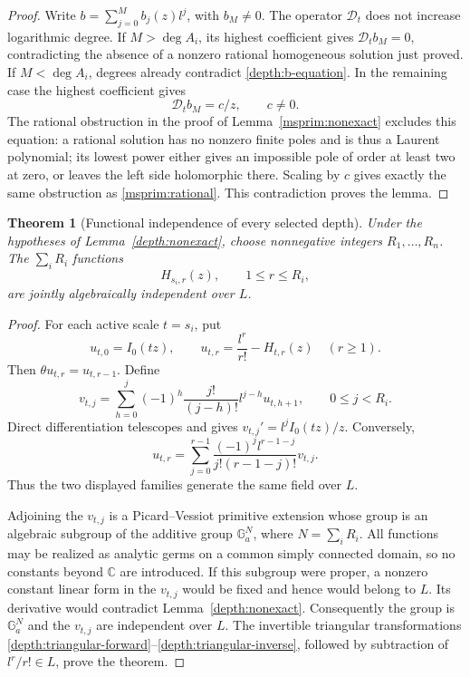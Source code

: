\documentclass[11pt]{article}
\newtheorem{theorem}{Theorem}[section]
\theoremstyle{definition}
\theoremstyle{remark}
\begin{document}
\begin{proof}
Write $b=\sum_{j=0}^M b_j(z)l^j$, with $b_M\ne0$.
The operator $\mathcal D_t$ does not increase logarithmic degree.
If $M>\deg A_i$, its highest coefficient gives
$\mathcal D_t b_M=0$, contradicting the absence of a nonzero
rational homogeneous solution just proved.  If $M<\deg A_i$,
degrees already contradict \eqref{depth:b-equation}.  In the remaining
case the highest coefficient gives
\[
                  \mathcal D_t b_M=c/z,\qquad c\ne0.
\]
The rational obstruction in the proof of
Lemma~\ref{msprim:nonexact} excludes this equation: a rational
solution has no nonzero finite poles and is thus a Laurent
polynomial; its lowest power either gives an impossible pole of
order at least two at zero, or leaves the left side holomorphic
there.  Scaling by $c$ gives exactly the same obstruction as
\eqref{msprim:rational}.  This contradiction proves the lemma.
\end{proof}

\begin{theorem}[Functional independence of every selected depth]
\label{depth:functional}
Under the hypotheses of Lemma~\ref{depth:nonexact}, choose
nonnegative integers $R_1,\ldots,R_n$.  The
$\sum_iR_i$ functions
\[
               H_{s_i,r}(z),\qquad 1\le r\le R_i,
\]
are jointly algebraically independent over $L$.
\end{theorem}

\begin{proof}
For each active scale $t=s_i$, put
\[
 u_{t,0}=I_0(tz),\qquad
 u_{t,r}=\frac{l^r}{r!}-H_{t,r}(z)\quad(r\ge1).
\]
Then $\theta u_{t,r}=u_{t,r-1}$.  Define
\begin{equation}\label{depth:triangular-forward}
 v_{t,j}=\sum_{h=0}^j
       (-1)^h\frac{j!}{(j-h)!}l^{j-h}u_{t,h+1},
       \qquad 0\le j<R_i.
\end{equation}
Direct differentiation telescopes and gives
$v_{t,j}'=l^j I_0(tz)/z$.  Conversely,
\begin{equation}\label{depth:triangular-inverse}
 u_{t,r}=\sum_{j=0}^{r-1}
       \frac{(-1)^j l^{r-1-j}}{j!(r-1-j)!}v_{t,j}.
\end{equation}
Thus the two displayed families generate the same field over $L$.

Adjoining the $v_{t,j}$ is a Picard--Vessiot primitive extension
whose group is an algebraic subgroup of the additive group
$\mathbb G_a^N$, where $N=\sum_iR_i$.
All functions may be realized as analytic germs on a common simply
connected domain, so no constants beyond $\mathbb C$ are introduced.
If this subgroup were proper, a nonzero constant linear form in the
$v_{t,j}$ would be fixed and hence would belong to $L$.
Its derivative would contradict Lemma~\ref{depth:nonexact}.
Consequently the group is $\mathbb G_a^N$ and the $v_{t,j}$ are
independent over $L$.  The invertible triangular transformations
\eqref{depth:triangular-forward}--\eqref{depth:triangular-inverse},
followed by subtraction of $l^r/r!\in L$, prove the theorem.
\end{proof}
\end{document}
